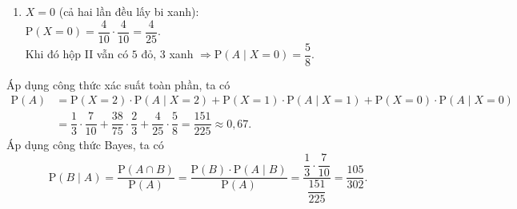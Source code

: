 \begin{ex}
{\begin{itemchoice}
\begin{enumerate}[{\it TH 1:}]
				Khi đó hộp II có $6$ đỏ, $3$ xanh $\Rightarrow \mathrm{P}(A\mid X=1) = \dfrac{6}{9} = \dfrac{2}{3}$.
				\item $X=0$ (cả hai lần đều lấy bi xanh):\\
				$\mathrm{P}(X=0) = \dfrac{4}{10} \cdot \dfrac{4}{10} = \dfrac{4}{25}$.\\
				Khi đó hộp II vẫn có $5$ đỏ, $3$ xanh $\Rightarrow \mathrm{P}(A\mid X=0) = \dfrac{5}{8}$.
			\end{enumerate}
			Áp dụng công thức xác suất toàn phần, ta có
			\allowdisplaybreaks
			\begin{align*}
				\mathrm{P}(A) &= \mathrm{P}(X=2) \cdot \mathrm{P}(A\mid X=2) + \mathrm{P}(X=1) \cdot \mathrm{P}(A\mid X=1) + \mathrm{P}(X=0) \cdot \mathrm{P}(A\mid X=0)\\
				&=\dfrac{1}{3} \cdot \dfrac{7}{10} + \dfrac{38}{75} \cdot \dfrac{2}{3} + \dfrac{4}{25} \cdot \dfrac{5}{8} = \dfrac{151}{225} \approx 0{,}67.
			\end{align*}
			\itemch Áp dụng công thức Bayes, ta có
			\[\mathrm{P}(B\mid A) = \dfrac{\mathrm{P}(A \cap B)}{\mathrm{P}(A)} = \dfrac{\mathrm{P}(B) \cdot \mathrm{P}(A\mid B)}{\mathrm{P}(A)} = \dfrac{\dfrac{1}{3} \cdot \dfrac{7}{10}}{\dfrac{151}{225}} = \dfrac{105}{302}.\]
		\end{itemchoice}
	}
\end{ex}

